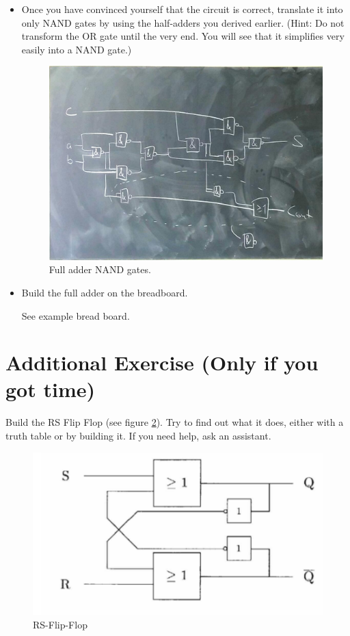 \documentclass[10pt,a4paper]{article}
\begin{document}
\begin{itemize}
		\item Once you have convinced yourself that the circuit is correct, translate it into only NAND gates by using the half-adders you derived earlier. (Hint: Do not transform the OR gate until the very end. You will see that it simplifies very easily into a NAND gate.)
		\begin{figure}[H]
			\centering		  
			\includegraphics[scale=0.3]{full_nand_adder}
			\caption{Full adder NAND gates.}
			\label{fig:full-adder}
		\end{figure}
		\item Build the full adder on the breadboard.
		\begin{center}
			See example bread board.
		\end{center}
	\end{itemize}


	\section{Additional Exercise (Only if you got time)}
	Build the RS Flip Flop (see figure \ref{fig:RSFF}). Try to find out what it does, either with a truth table or by building it. If you need help, ask an assistant.
	
	\begin{figure}[H]
		\centering
		\includegraphics[height=0.35\textwidth]{RSFF}%
		\caption{RS-Flip-Flop}%
		\label{fig:RSFF}
	\end{figure}
	
\end{document}
